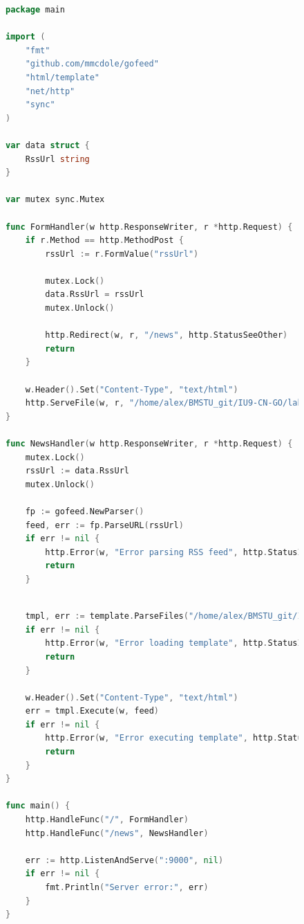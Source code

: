 \documentclass[a4paper, 14pt]{extarticle}
\begin{document}
\newpage

\begin{figure}[!htb]
\begin{lstlisting}[language={Go},caption={o.3.go},label={lst:code6}]
package main

import (
	"fmt"
	"github.com/mmcdole/gofeed"
	"html/template"
	"net/http"
	"sync"
)

var data struct {
	RssUrl string
}

var mutex sync.Mutex

func FormHandler(w http.ResponseWriter, r *http.Request) {
	if r.Method == http.MethodPost {
		rssUrl := r.FormValue("rssUrl")

		mutex.Lock()
		data.RssUrl = rssUrl
		mutex.Unlock()

		http.Redirect(w, r, "/news", http.StatusSeeOther)
		return
	}

	w.Header().Set("Content-Type", "text/html")
	http.ServeFile(w, r, "/home/alex/BMSTU_git/IU9-CN-GO/lab1/0.3/form.html")
}

func NewsHandler(w http.ResponseWriter, r *http.Request) {
	mutex.Lock()
	rssUrl := data.RssUrl
	mutex.Unlock()

	fp := gofeed.NewParser()
	feed, err := fp.ParseURL(rssUrl)
	if err != nil {
		http.Error(w, "Error parsing RSS feed", http.StatusInternalServerError)
		return
	}

\end{lstlisting}
\end{figure}

\newpage
\begin{figure}[!htb]
\begin{lstlisting}[language={Go},caption={o.3.go - продолжение},label={lst:code7}]

	tmpl, err := template.ParseFiles("/home/alex/BMSTU_git/IU9-CN-GO/lab1/0.3/news.html")
	if err != nil {
		http.Error(w, "Error loading template", http.StatusInternalServerError)
		return
	}

	w.Header().Set("Content-Type", "text/html")
	err = tmpl.Execute(w, feed)
	if err != nil {
		http.Error(w, "Error executing template", http.StatusInternalServerError)
		return
	}
}

func main() {
	http.HandleFunc("/", FormHandler)
	http.HandleFunc("/news", NewsHandler)

	err := http.ListenAndServe(":9000", nil)
	if err != nil {
		fmt.Println("Server error:", err)
	}
}
\end{lstlisting}
\end{figure}
\end{document}
